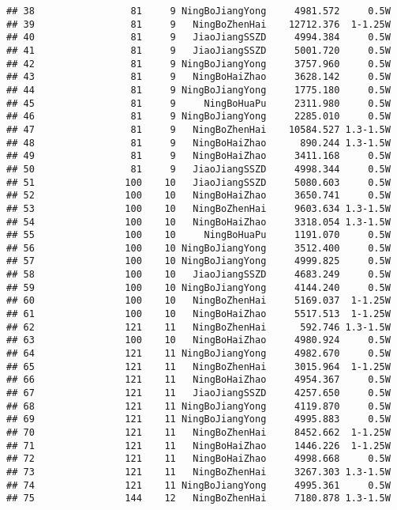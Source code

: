\documentclass[]{article}
\begin{document}
\begin{verbatim}
## 38                 81     9 NingBoJiangYong     4981.572     0.5W
## 39                 81     9   NingBoZhenHai    12712.376  1-1.25W
## 40                 81     9   JiaoJiangSSZD     4994.384     0.5W
## 41                 81     9   JiaoJiangSSZD     5001.720     0.5W
## 42                 81     9 NingBoJiangYong     3757.960     0.5W
## 43                 81     9   NingBoHaiZhao     3628.142     0.5W
## 44                 81     9 NingBoJiangYong     1775.180     0.5W
## 45                 81     9     NingBoHuaPu     2311.980     0.5W
## 46                 81     9 NingBoJiangYong     2285.010     0.5W
## 47                 81     9   NingBoZhenHai    10584.527 1.3-1.5W
## 48                 81     9   NingBoHaiZhao      890.244 1.3-1.5W
## 49                 81     9   NingBoHaiZhao     3411.168     0.5W
## 50                 81     9   JiaoJiangSSZD     4998.344     0.5W
## 51                100    10   JiaoJiangSSZD     5080.603     0.5W
## 52                100    10   NingBoHaiZhao     3650.741     0.5W
## 53                100    10   NingBoZhenHai     9603.634 1.3-1.5W
## 54                100    10   NingBoHaiZhao     3318.054 1.3-1.5W
## 55                100    10     NingBoHuaPu     1191.070     0.5W
## 56                100    10 NingBoJiangYong     3512.400     0.5W
## 57                100    10 NingBoJiangYong     4999.825     0.5W
## 58                100    10   JiaoJiangSSZD     4683.249     0.5W
## 59                100    10 NingBoJiangYong     4144.240     0.5W
## 60                100    10   NingBoZhenHai     5169.037  1-1.25W
## 61                100    10   NingBoHaiZhao     5517.513  1-1.25W
## 62                121    11   NingBoZhenHai      592.746 1.3-1.5W
## 63                100    10   NingBoHaiZhao     4980.924     0.5W
## 64                121    11 NingBoJiangYong     4982.670     0.5W
## 65                121    11   NingBoZhenHai     3015.964  1-1.25W
## 66                121    11   NingBoHaiZhao     4954.367     0.5W
## 67                121    11   JiaoJiangSSZD     4257.650     0.5W
## 68                121    11 NingBoJiangYong     4119.870     0.5W
## 69                121    11 NingBoJiangYong     4995.883     0.5W
## 70                121    11   NingBoZhenHai     8452.662  1-1.25W
## 71                121    11   NingBoHaiZhao     1446.226  1-1.25W
## 72                121    11   NingBoHaiZhao     4998.668     0.5W
## 73                121    11   NingBoZhenHai     3267.303 1.3-1.5W
## 74                121    11 NingBoJiangYong     4995.361     0.5W
## 75                144    12   NingBoZhenHai     7180.878 1.3-1.5W

\end{verbatim}
\end{document}
